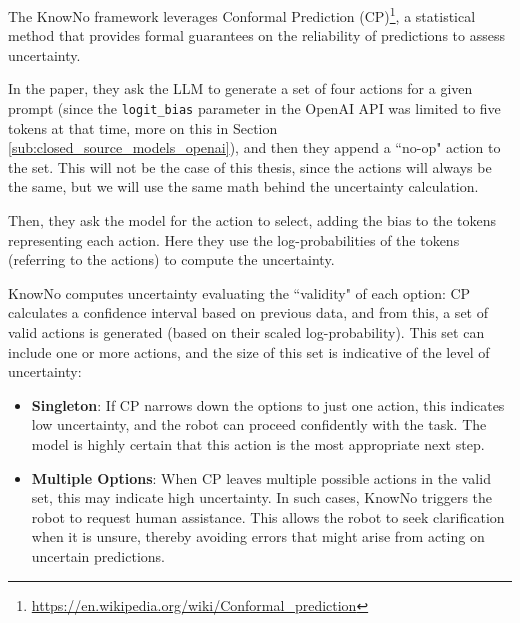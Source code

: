 The KnowNo framework leverages Conformal Prediction (CP)\footnote{\url{https://en.wikipedia.org/wiki/Conformal_prediction}},
a statistical method that provides formal guarantees on the reliability of predictions
to assess uncertainty.

In the paper, they ask the LLM to generate a set of four actions for a given
prompt (since the \texttt{logit\_bias} parameter in the OpenAI API was limited
to five tokens at that time, more on this in Section \ref{sub:closed_source_models_openai}),
and then they append a ``no-op" action to the set. This will not be the case of this
thesis, since the actions will always be the same, but we will use the same math
behind the uncertainty calculation.

Then, they ask the model for the action to select, adding the bias to the tokens
representing each action. Here they use the log-probabilities of the tokens (referring
to the actions) to compute the uncertainty.

KnowNo computes uncertainty evaluating the ``validity" of each option: CP
calculates a confidence interval based on previous data, and from this, a set of
valid actions is generated (based on their scaled log-probability). This set can
include one or more actions, and the size of this set is indicative of the level
of uncertainty:
\begin{itemize}
  \item \textbf{Singleton}: If CP narrows down the options to just one action,
    this indicates low uncertainty, and the robot can proceed confidently with the
    task. The model is highly certain that this action is the most appropriate
    next step.

  \item \textbf{Multiple Options}: When CP leaves multiple possible actions in the
    valid set, this may indicate high uncertainty. In such cases, KnowNo
    triggers the robot to request human assistance. This allows the robot to seek
    clarification when it is unsure, thereby avoiding errors that might arise
    from acting on uncertain predictions.
\end{itemize}

